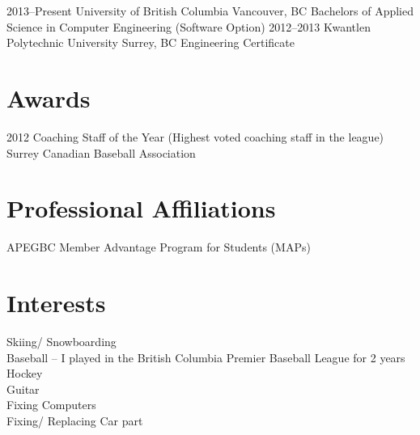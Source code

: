 \documentclass[]{friggeri-cv} %
\begin{document}
\begin{entrylist}
\entry
{2013--Present}
{University of British Columbia}  %
{Vancouver, BC}
{Bachelors of Applied Science in Computer Engineering (Software Option)}
\entry
{2012--2013}
{Kwantlen Polytechnic University} %
{Surrey, BC}
{Engineering Certificate}
\end{entrylist}


\section{Awards}

\begin{entrylist}
\entry
{2012}
{Coaching Staff of the Year (Highest voted coaching staff in the league)}
{}
{Surrey Canadian Baseball Association}
\end{entrylist}


\section{Professional Affiliations}
\begin{entrylist}
\entry
{}
{APEGBC Member Advantage Program for Students (MAPs)}
{}
{}
\end{entrylist}


\section{Interests}

Skiing/ Snowboarding \\
Baseball – I played in the British Columbia Premier Baseball League for 2 years \\
Hockey \\
Guitar \\
Fixing Computers \\
Fixing/ Replacing Car part \\

\newpage
\end{document}
